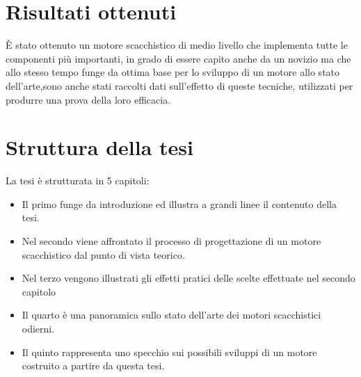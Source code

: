 \section{Risultati ottenuti}
È stato ottenuto un motore scacchistico di medio livello che implementa tutte le componenti più importanti, in grado di essere 
capito anche da un novizio ma che allo stesso tempo funge da ottima base per lo sviluppo di un motore allo stato dell'arte,sono anche
stati raccolti dati sull'effetto di queste tecniche, utilizzati per produrre una prova della loro efficacia.



\section{Struttura della tesi}
La tesi è strutturata in 5 capitoli:
\begin{itemize}
\item Il primo funge da introduzione ed illustra a grandi linee il contenuto della tesi. 
\item Nel secondo viene affrontato il processo di progettazione di un motore scacchistico dal punto di vista teorico.
\item Nel terzo vengono illustrati gli effetti pratici delle scelte effettuate nel secondo capitolo
\item Il quarto è una panoramica sullo stato dell'arte dei motori scacchistici odierni.
\item Il quinto rappresenta uno specchio sui possibili sviluppi di un motore costruito a partire da questa tesi.
\end{itemize}
